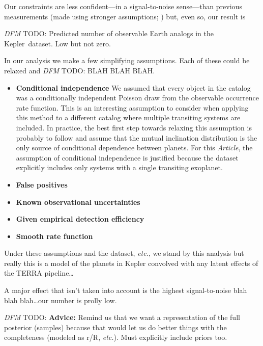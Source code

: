 \documentclass[12pt,preprint]{aastex}
\newcommand{\project}[1]{{\sffamily #1}}
\newcommand{\kepler}{\project{Kepler}}
\newcommand{\paper}{\textsl{Article}}
\newcommand{\foreign}[1]{\emph{#1}}
\newcommand{\etc}{\foreign{etc.}}
\newcommand{\todo}[3]{{\color{#2} \emph{#1} TODO: #3}}
\newcommand{\dfmtodo}[1]{\todo{DFM}{red}{#1}}
\begin{document}
Our constraints are less confident---in a signal-to-noise sense---than
previous measurements (made using stronger assumptions; \citealt{petigura})
but, even so, our result is

\dfmtodo{%
Predicted number of observable Earth analogs in the \kepler\ dataset.
Low but not zero.
}

In our analysis we make a few simplifying assumptions.
Each of these could be relaxed and \dfmtodo{BLAH BLAH BLAH}.
\begin{itemize}

\item {\bf Conditional independence}\quad
We assumed that every object in the catalog was a conditionally independent
Poisson draw from the observable occurrence rate function.
This is an interesting assumption to consider when applying this method to a
different catalog where multiple transiting systems are included.
In practice, the best first step towards relaxing this assumption is probably
to follow \citet{tremaine} and assume that the mutual inclination distribution
is the only source of conditional dependence between planets.
For this \paper, the assumption of conditional independence is justified
because the dataset explicitly includes only systems with a single transiting
exoplanet.

\item {\bf False positives}\quad

\item {\bf Known observational uncertainties}\quad

\item {\bf Given empirical detection efficiency}\quad

\item {\bf Smooth rate function}\quad

\end{itemize}

Under these assumptions and the dataset, \etc, we stand by this analysis but
really this is a model of the planets in Kepler convolved with any latent
effects of the TERRA pipeline\ldots

A major effect that isn't taken into account is the highest signal-to-noise
blah blah blah\ldots our number is prolly low.

\dfmtodo{%
{\bf Advice:} \quad
Remind us that we want a representation of the full posterior (samples)
because that would let us do better things with the completeness (modeled as
r/R, \etc).
Must explicitly include priors too.
}
\end{document}

